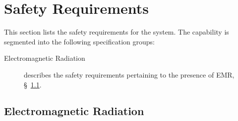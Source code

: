 \KNEADSECTIONNEWPAGE
\section{Safety Requirements}
\label{lab:sec_Safety}


This section lists the safety requirements for the system. The \ThisSys capability is segmented into the following specification groups:

\begin{description}
	\item [Electromagnetic Radiation] describes the safety requirements pertaining to the presence of EMR, \S~\ref{loc:SAFETY_EMR}.
\end{description}

\KNEADSUBSECTIONNEWPAGE
\subsection{Electromagnetic Radiation}
\label{loc:SAFETY_EMR}



